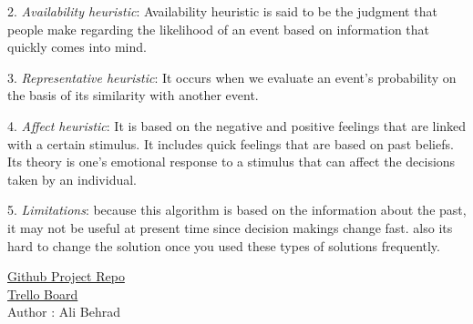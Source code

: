\documentclass[12pt]{article}
\begin{document}
2. \textit{Availability heuristic}: Availability heuristic is said to be the judgment that people make regarding the likelihood of an event based on information that quickly comes into mind.

3. \textit{Representative heuristic}: It occurs when we evaluate an event's probability on the basis of its similarity with another event.

4. \textit{Affect heuristic}: It is based on the negative and positive feelings that are linked with a certain stimulus. It includes quick feelings that are based on past beliefs. Its theory is one's emotional response to a stimulus that can affect the decisions taken by an individual.

5. \textit{Limitations}: because this algorithm is based on the information about the past, it may not be useful at present time since decision makings change fast.
also its hard to change the solution once you used these types of solutions frequently.

\begin{center}
    \href{https://www.github.com/AliBhd1024/OOP-Project}{Github Project Repo} \\
    \href{https://trello.com/invite/b/vExKbMGO/ATTIa4b9a2b7743b7449eddbede0e68850ba7E1D17C4/food-delivery-oop}{Trello Board} \\
    Author : Ali Behrad
\end{center}
\end{document}
